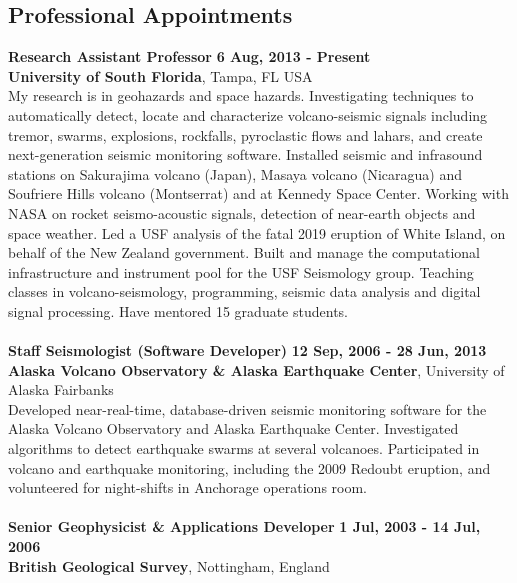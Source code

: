 \documentclass[margin,line]{res}
\begin{document}
\begin{resume}
\section{\sc Professional Appointments}
%
{\bf Research Assistant Professor} \hfill {\bf 6 Aug, 2013 - Present} \\
{\bf University of South Florida}, Tampa, FL USA\\
My research is in geohazards and space hazards. Investigating techniques to automatically detect, locate and characterize volcano-seismic signals including tremor, swarms, explosions, rockfalls, pyroclastic flows and lahars, and create next-generation seismic monitoring software. Installed seismic and infrasound stations on Sakurajima volcano (Japan), Masaya volcano (Nicaragua) and Soufriere Hills volcano (Montserrat) and at Kennedy Space Center. Working with NASA on rocket seismo-acoustic signals, detection of near-earth objects and space weather. Led a USF analysis of the fatal 2019 eruption of White Island, on behalf of the New Zealand government. Built and manage the computational infrastructure and instrument pool for the USF Seismology group. Teaching classes in volcano-seismology, programming, seismic data analysis and digital signal processing. Have mentored 15 graduate students.  
\\
\hdashline
\\
%
{\bf Staff Seismologist (Software Developer)} \hfill {\bf 12 Sep, 2006 - 28 Jun, 2013} \\
{\bf Alaska Volcano Observatory \& Alaska Earthquake Center}, University of Alaska Fairbanks\\
Developed near-real-time, database-driven seismic monitoring software for the Alaska Volcano
Observatory and Alaska Earthquake Center. Investigated algorithms to detect earthquake swarms
at several volcanoes. Participated in volcano and earthquake monitoring, including the 2009
Redoubt eruption, and volunteered for night-shifts in Anchorage operations room. 
\\
\hdashline
\\
%
{\bf Senior Geophysicist \& Applications Developer} \hfill {\bf 1 Jul, 2003 - 14 Jul, 2006} \\
{\bf British Geological Survey}, Nottingham, England \\

\end{resume}
\end{document}
